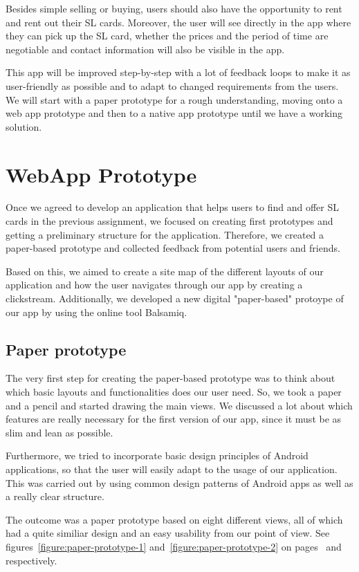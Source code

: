 \documentclass[11pt,twoside,a4paper]{report}
\begin{document}
Besides simple selling or buying, users should also have the opportunity to rent and rent out their SL cards. Moreover, the user will see directly in the app where they can pick up the SL card, whether the prices and the period of time are negotiable and contact information will also be visible in the app.

This app will be improved step-by-step with a lot of feedback loops to make it as user-friendly as possible and to adapt to changed requirements from the users. We will start with a paper prototype for a rough understanding, moving onto a web app prototype and then to a native app prototype until we have a working solution.

\chapter{WebApp Prototype}

Once we agreed to develop an application that helps users to find and offer SL cards in the previous assignment, we focused on creating first prototypes and getting a preliminary structure for the application. Therefore, we created a paper-based prototype and collected feedback from potential users and friends.

Based on this, we aimed to create a site map of the different layouts of our application and how the user navigates through our app by creating a clickstream. Additionally, we developed a new digital "paper-based" protoype of our app by using the online tool Balsamiq.

\section{Paper prototype}

The very first step for creating the paper-based prototype was to think about which basic layouts and functionalities does our user need. So, we took a paper and a pencil and started drawing the main views. We discussed a lot about which features are really necessary for the first version of our app, since it must be as slim and lean as possible.

Furthermore, we tried to incorporate basic design principles of Android applications, so that the user will easily adapt to the usage of our application. This was carried out by using common design patterns of Android apps as well as a really clear structure.

The outcome was a paper prototype based on eight different views, all of which had a quite similiar design and an easy usability from our point of view. See figures~\ref{figure:paper-prototype-1} and~\ref{figure:paper-prototype-2} on pages~\pageref{figure:paper-prototype-1} and~\pageref{figure:paper-prototype-2} respectively.
\end{document}
